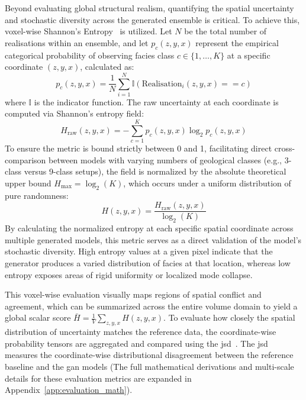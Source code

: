 Beyond evaluating global structural realism, quantifying the spatial uncertainty and stochastic diversity across the generated ensemble is critical. To achieve this, voxel-wise Shannon's Entropy~\parencite{shannon1948mathematical} is utilized. Let $N$ be the total number of realisations within an ensemble, and let $p_c(z, y, x)$ represent the empirical categorical probability of observing facies class $c \in \{1, \dots, K\}$ at a specific coordinate $(z, y, x)$, calculated as:
\begin{equation}
    p_c(z, y, x) = \frac{1}{N} \sum_{i=1}^{N} \mathbb{I}(\text{Realisation}_i(z, y, x) == c)
\end{equation}
where $\mathbb{I}$ is the indicator function. The raw uncertainty at each coordinate is computed via Shannon's entropy field:
\begin{equation}
    H_{\text{raw}}(z, y, x) = -\sum_{c=1}^{K} p_c(z, y, x) \log_2 p_c(z, y, x)
\end{equation}
To ensure the metric is bound strictly between 0 and 1, facilitating direct cross-comparison between models with varying numbers of geological classes (e.g., 3-class versus 9-class setups), the field is normalized by the absolute theoretical upper bound $H_{\text{max}} = \log_2(K)$, which occurs under a uniform distribution of pure randomness:
\begin{equation}
    H(z, y, x) = \frac{H_{\text{raw}}(z, y, x)}{\log_2(K)}
\end{equation}
By calculating the normalized entropy at each specific spatial coordinate across multiple generated models, this metric serves as a direct validation of the model's stochastic diversity. High entropy values at a given pixel indicate that the generator produces a varied distribution of facies at that location, whereas low entropy exposes areas of rigid uniformity or localized mode collapse. 

This voxel-wise evaluation visually maps regions of spatial conflict and agreement, which can be summarized across the entire volume domain to yield a global scalar score $\bar{H} = \frac{1}{V}\sum_{z,y,x} H(z,y,x)$. To evaluate how closely the spatial distribution of uncertainty matches the reference data, the coordinate-wise probability tensors are aggregated and compared using the \gls{jsd}~\parencite{lin1991divergence}. The \gls{jsd} measures the coordinate-wise distributional disagreement between the reference baseline and the \gls{gan} models (The full mathematical derivations and multi-scale details for these evaluation metrics are expanded in Appendix~\ref{app:evaluation_math}).

